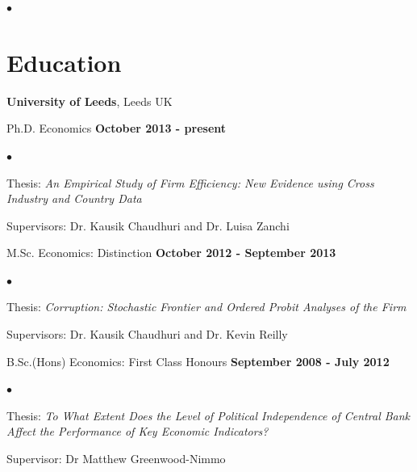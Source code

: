 \documentclass[margin,line]{res}
\newenvironment{list1}{
  \begin{list}{\ding{113}}{%
      \setlength{\itemsep}{0in}
      \setlength{\parsep}{0in} \setlength{\parskip}{0in}
      \setlength{\topsep}{0in} \setlength{\partopsep}{0in} 
      \setlength{\leftmargin}{0.17in}}}{\end{list}}
\newenvironment{list2}{
  \begin{list}{$\bullet$}{%
      \setlength{\itemsep}{0in}
      \setlength{\parsep}{0in} \setlength{\parskip}{0in}
      \setlength{\topsep}{0in} \setlength{\partopsep}{0in} 
      \setlength{\leftmargin}{0.2in}}}{\end{list}}
\begin{document}
\begin{resume}
\begin{list2}
\section{\sc Education}
{\bf University of Leeds}, Leeds UK\\
\vspace*{-.1in}
\begin{list1}
\item[] Ph.D. Economics  \hfill {\bf October 2013 - present}
\begin{list2}
\vspace*{.05in}
\item Thesis: \textit{An Empirical Study of Firm Efficiency: New Evidence using Cross Industry and Country Data} 
\item Supervisors:  Dr. Kausik Chaudhuri and Dr. Luisa Zanchi
\end{list2}
\end{list1}
\vspace*{.1in}
\begin{list1}
\item[] M.Sc. Economics: Distinction \hfill {\bf October 2012 - September 2013}
\vspace*{.05in}
\begin{list2}
\item Thesis: \textit{Corruption: Stochastic Frontier and Ordered Probit Analyses of the Firm}
\item Supervisors:  Dr. Kausik Chaudhuri and Dr. Kevin Reilly
\end{list2}
\end{list1}

\vspace*{.1in}
\begin{list1}
\item[] B.Sc.(Hons) Economics: First Class Honours \hfill {\bf September 2008 - July 2012}
\vspace*{.05in}
\begin{list2}
\item Thesis: \textit{To What Extent Does the Level of Political Independence of Central Bank Affect the Performance of Key Economic Indicators?}
\item Supervisor: Dr Matthew Greenwood-Nimmo
\end{list2}
\end{list1}


\end{list2}
\end{resume}
\end{document}
